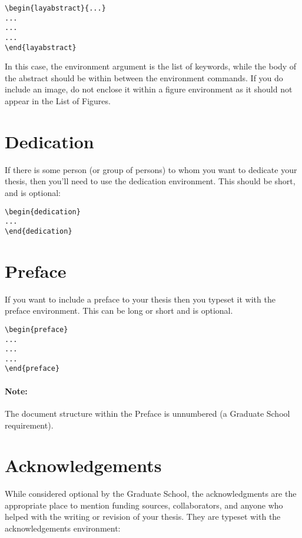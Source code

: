 \begin{verbatim}
\begin{layabstract}{...}
...
...
...
\end{layabstract}
\end{verbatim}

In this case, the environment argument is the list of keywords, while the body of the abstract should be within between the environment commands.  If you do include an image, do not enclose it within a figure environment as it should not appear in the List of Figures.

\section{Dedication}
If there is some person (or group of persons) to whom you want to dedicate your thesis, then you'll need to use the dedication environment.  This should be short, and is optional:
\begin{verbatim}
\begin{dedication}
...
\end{dedication}
\end{verbatim}

\section{Preface}
If you want to include a preface to your thesis then you typeset it with the preface environment.  This can be long or short and is optional.

\begin{verbatim}
\begin{preface}
...
...
...
\end{preface}
\end{verbatim}

\paragraph{Note:}The document structure within the Preface is unnumbered (a Graduate School requirement).

\section{Acknowledgements}
While considered optional by the Graduate School, the acknowledgments are the appropriate place to mention funding sources, collaborators, and anyone who helped with the writing or revision of your thesis.  They are typeset with the acknowledgements environment:

